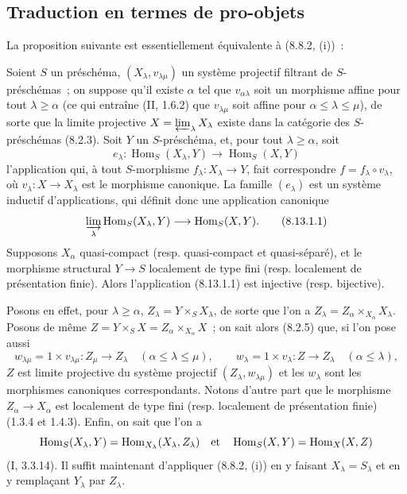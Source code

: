 \subsection{Traduction en termes de pro-objets}
\label{subsection:IV.8.13-fr}

La proposition suivante est essentiellement équivalente à (8.8.2, (i))~:

\begin{proposition}[8.13.1]
\label{IV.8.13.1-fr}
Soient $S$ un préschéma, $(X_\lambda,v_{\lambda\mu})$ un système projectif
filtrant de $S$-préschémas~; on suppose qu'il existe $\alpha$ tel que
$v_{\alpha\lambda}$ soit un morphisme affine pour tout $\lambda\geqslant
\alpha$ (ce qui entraîne (II, 1.6.2) que $v_{\lambda\mu}$ soit affine pour
$\alpha\leqslant\lambda\leqslant\mu$), de sorte que la limite projective
$X=\varprojlim_\lambda X_\lambda$ existe dans la catégorie des $S$-préschémas
(8.2.3). Soit $Y$ un $S$-préschéma, et, pour tout $\lambda\geqslant\alpha$,
soit
\[
e_\lambda:\operatorname{Hom}_S(X_\lambda,Y)
\longrightarrow\operatorname{Hom}_S(X,Y)
\]
l'application qui, à tout $S$-morphisme $f_\lambda:X_\lambda\to Y$, fait
correspondre $f=f_\lambda\circ v_\lambda$, où $v_\lambda:X\to X_\lambda$
est le morphisme canonique. La famille $(e_\lambda)$ est un système inductif
d'applications, qui définit donc une application canonique
\begin{equation}
\label{IV.8.13.1.1-fr}
\varinjlim_\lambda\operatorname{Hom}_S(X_\lambda,Y)
\longrightarrow\operatorname{Hom}_S(X,Y). \tag{8.13.1.1}
\end{equation}
Supposons $X_\alpha$ quasi-compact (resp. quasi-compact et quasi-séparé), et le
morphisme structural $Y\to S$ localement de type fini (resp. localement de
présentation finie). Alors l'application (8.13.1.1) est injective (resp.
bijective).
\end{proposition}

Posons en effet, pour $\lambda\geqslant\alpha$,
$Z_\lambda=Y\times_S X_\lambda$, de sorte que l'on a
$Z_\lambda=Z_\alpha\times_{X_\alpha}X_\lambda$. Posons de même
$Z=Y\times_S X=Z_\alpha\times_{X_\alpha}X$~; on sait alors (8.2.5) que, si
l'on pose aussi
\[
w_{\lambda\mu}=1\times v_{\lambda\mu}:Z_\mu\to Z_\lambda
\quad(\alpha\leqslant\lambda\leqslant\mu),
\qquad
w_\lambda=1\times v_\lambda:Z\to Z_\lambda
\quad(\alpha\leqslant\lambda),
\]
$Z$ est limite projective du système projectif $(Z_\lambda,w_{\lambda\mu})$
et les $w_\lambda$ sont les morphismes canoniques correspondants. Notons
d'autre part que le morphisme $Z_\alpha\to X_\alpha$ est localement de type
fini (resp. localement de présentation finie) (1.3.4 et 1.4.3). Enfin, on
sait que l'on a
\[
\operatorname{Hom}_S(X_\lambda,Y)
=\operatorname{Hom}_{X_\lambda}(X_\lambda,Z_\lambda)
\quad\hbox{et}\quad
\operatorname{Hom}_S(X,Y)=\operatorname{Hom}_X(X,Z)
\]
(I, 3.3.14). Il suffit maintenant d'appliquer (8.8.2, (i)) en y faisant
$X_\lambda=S_\lambda$ et en y remplaçant $Y_\lambda$ par $Z_\lambda$.

